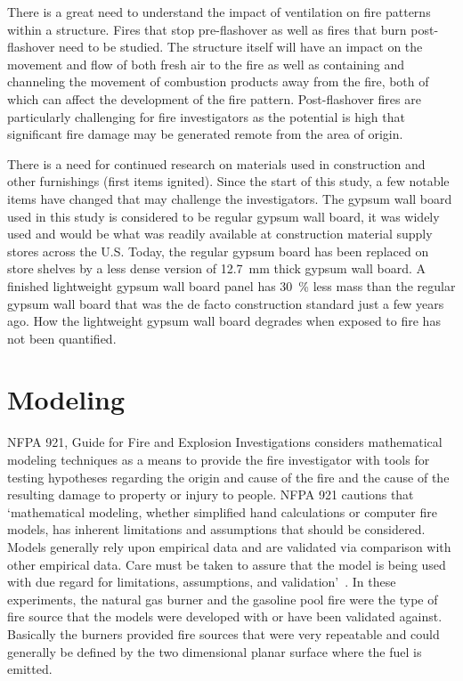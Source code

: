 \documentclass[twoside]{uocthesis}
\begin{document}
{There is a great need to understand the impact of ventilation on fire patterns within a structure.  Fires that stop pre-flashover as well as fires that burn post-flashover need to be studied.  The structure itself will have an impact on the movement and flow of both fresh air to the fire as well as containing and channeling the movement of combustion products away from the fire, both of which can affect the development of the fire pattern.  Post-flashover fires are particularly challenging for fire investigators as the potential is high that significant fire damage may be generated remote from the area of origin.  

There is a need for continued research on materials used in construction and other furnishings (first items ignited).  Since the start of this study, a few notable items have changed that may challenge the investigators.  The gypsum wall board used in this study is considered to be regular gypsum wall board, it was widely used and would be what was readily available at construction material supply stores across the U.S.  Today, the regular gypsum board has been replaced on store shelves by a less dense version of 12.7~mm thick gypsum wall board.  A finished lightweight gypsum wall board panel has 30~\% less mass than the regular gypsum wall board that was the de facto construction standard just a few years ago.  How the lightweight gypsum wall board degrades when exposed to fire has not been quantified.    

\section{Modeling}
          
NFPA 921, Guide for Fire and Explosion Investigations considers mathematical modeling techniques as a means to provide the fire investigator with tools for testing hypotheses regarding the origin and cause of the fire and the cause of the resulting damage to property or injury to people.  NFPA 921 cautions that `mathematical modeling, whether simplified hand calculations or computer fire models, has inherent limitations and assumptions that should be considered. Models generally rely upon empirical data and are validated via comparison with other empirical data. Care must be taken to assure that the model is being used with due regard for limitations, assumptions, and validation'~\cite{NFPA:921}.  In these experiments, the natural gas burner and the gasoline pool fire were the type of fire source that the models were developed with or have been validated against.  Basically the burners provided fire sources that were very repeatable and could generally be defined by the two dimensional planar surface where the fuel is emitted.  

}
\end{document}
